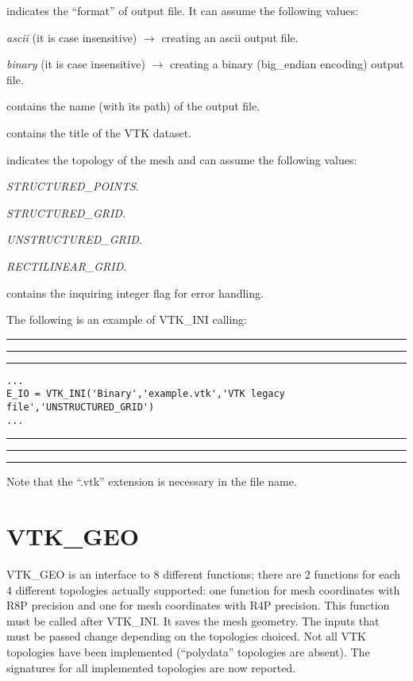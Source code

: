 \documentclass[pagesize=pdftex,fontsize=10pt,paper=a4,oneside]{scrbook}
\DeclareRobustCommand{\MarginNote}[1]{\marginpar{%
\slshape\footnotesize%
\parindent=0pt\lineskip=0pt\lineskiplimit=0pt%
\tolerance=2000\hyphenpenalty=300\exhyphenpenalty=300%
\doublehyphendemerits=100000\finalhyphendemerits=\doublehyphendemerits%
\raggedright\hspace{0pt}#1}}
\newenvironment{boxred}[1]%
               {%
                \noindent\hspace*{-0.025\textwidth}%
                \color{Maroon}%
                \rule[-5.8pt]{0.6pt}{6pt}\hspace*{-0.6pt}\rule{1.05\textwidth}{0.6pt}\hspace*{-0.6pt}\rule[-5.8pt]{0.6pt}{6pt}%
                \color{black}%
                \vspace*{0.6pt}\MarginNote{\color{Maroon}{#1}}%
               }%
               {%
                \noindent\hspace*{-0.025\textwidth}%
                \color{Maroon}%
                \rule[0pt]{0.6pt}{6pt}\hspace*{-0.6pt}\rule{1.05\textwidth}{0.6pt}\hspace*{-0.6pt}\rule[0pt]{0.6pt}{6pt}%
                \color{black}%
                \vspace*{2mm}%
               }
\newenvironment{enumerateABlu}%
{\def\theenumi{\textsc{\EnumFont\color{RoyalBlue}\Alph{enumi}}}%
\enumerate}%
{\endenumerate}
\newcommand{\virgo}[1]{``{#1}''}
\begin{document}
\begin{description}
 \item[{\color{RoyalBlue}output\_format}] indicates the \virgo{format} of output file. It can assume the following values:
 \begin{enumerateABlu}
  \item \emph{ascii} (it is case insensitive) $\rightarrow$ creating an ascii output file.
  \item \emph{binary} (it is case insensitive) $\rightarrow$ creating a binary (big\_endian encoding) output file.
 \end{enumerateABlu}
 \item[{\color{RoyalBlue}filename}] contains the name (with its path) of the output file.
 \item[{\color{RoyalBlue}title}] contains the title of the VTK dataset.
 \item[{\color{RoyalBlue}topology}] indicates the topology of the mesh and can assume the following values:
 \begin{enumerateABlu}
  \item \emph{STRUCTURED\_POINTS}.
  \item \emph{STRUCTURED\_GRID}.
  \item \emph{UNSTRUCTURED\_GRID}.
  \item \emph{RECTILINEAR\_GRID}.
 \end{enumerateABlu}
 \item[{\color{RoyalBlue}E\_IO}] contains the inquiring integer flag for error handling.
\end{description}

The following is an example of VTK\_INI calling:

\begin{boxred}{VTK\_INI Calling}
\begin{verbatim}
...
E_IO = VTK_INI('Binary','example.vtk','VTK legacy file','UNSTRUCTURED_GRID')
...
\end{verbatim}
\end{boxred}
\noindent Note that the \virgo{.vtk} extension is necessary in the file name.


\section{VTK\_GEO}

VTK\_GEO is an interface to 8 different functions; there are 2 functions for each 4 different topologies actually supported:
one function for mesh coordinates with R8P precision and one for mesh coordinates with R4P precision.
This function must be called after VTK\_INI. It saves the mesh geometry. The inputs that must be passed change depending on
the topologies choiced. Not all VTK topologies have been implemented (\virgo{polydata} topologies are absent). The signatures
for all implemented topologies are now reported.
\end{document}
